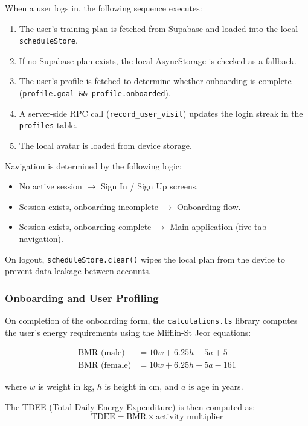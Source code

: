 When a user logs in, the following sequence executes:
\begin{enumerate}
    \item The user's training plan is fetched from Supabase and loaded into
    the local \texttt{scheduleStore}.
    \item If no Supabase plan exists, the local AsyncStorage is checked as
    a fallback.
    \item The user's profile is fetched to determine whether onboarding is
    complete (\texttt{profile.goal \&\& profile.onboarded}).
    \item A server-side RPC call (\texttt{record\_user\_visit}) updates the
    login streak in the \texttt{profiles} table.
    \item The local avatar is loaded from device storage.
\end{enumerate}

Navigation is determined by the following logic:
\begin{itemize}
    \item No active session $\rightarrow$ Sign In / Sign Up screens.
    \item Session exists, onboarding incomplete $\rightarrow$ Onboarding
    flow.
    \item Session exists, onboarding complete $\rightarrow$ Main application
    (five-tab navigation).
\end{itemize}

On logout, \texttt{scheduleStore.clear()} wipes the local plan from the
device to prevent data leakage between accounts.

\subsubsection{Onboarding and User Profiling}

On completion of the onboarding form, the \texttt{calculations.ts} library
computes the user's energy requirements using the Mifflin-St Jeor equations:

\begin{align}
    \text{BMR (male)} &= 10w + 6.25h - 5a + 5 \\
    \text{BMR (female)} &= 10w + 6.25h - 5a - 161
\end{align}

where $w$ is weight in kg, $h$ is height in cm, and $a$ is age in years.

The TDEE (Total Daily Energy Expenditure) is then computed as:
\begin{equation}
    \text{TDEE} = \text{BMR} \times \text{activity multiplier}
\end{equation}

